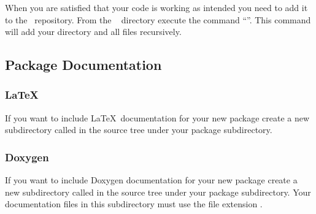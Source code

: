 When you are satisfied that your code is working as intended you need
to add it to the \svn\ repository.  From the \draco\ 
directory execute the command ``''.
This command will add your directory and all files recursively.


\subsection{Package Documentation}

\subsubsection{\LaTeX} 
If you want to include \LaTeX\ documentation for your new package
create a new subdirectory called  in the source tree under
your package subdirectory.


\subsubsection{Doxygen}
If you want to include Doxygen documentation for your new package
create a new subdirectory called  in the source tree
under your package subdirectory.  Your documentation files in this
subdirectory must use the file extension .

